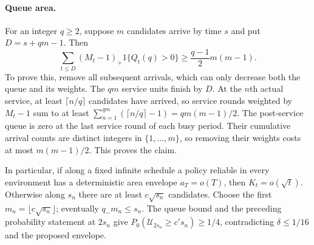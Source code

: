 \paragraph{Queue area.}
For an integer $q\ge2$, suppose $m$ candidates arrive by time $s$ and put
$D=s+qm-1$. Then
\[
 \sum_{t\le D}(M_t-1)_+1\{Q_t(q)>0\}
 \ge\frac{q-1}{2}m(m-1).
\]
To prove this, remove all subsequent arrivals, which can only decrease both
the queue and its weights. The $qm$ service units finish by $D$. At the
$n$th actual service, at least $\lceil n/q\rceil$ candidates have arrived,
so service rounds weighted by $M_t-1$ sum to at least
$\sum_{n=1}^{qm}(\lceil n/q\rceil-1)=qm(m-1)/2$.
The post-service queue is zero at the last service round of each busy period.
Their cumulative arrival counts are distinct integers in $\{1,\ldots,m\}$,
so removing their weights costs at most $m(m-1)/2$. This proves the claim.

In particular, if along a fixed infinite schedule a policy reliable in every
environment has a deterministic area envelope $a_T=o(T)$, then
$K_t=o(\sqrt t)$. Otherwise along $s_n$ there are at least $c\sqrt{s_n}$
candidates. Choose the first $m_n=\lfloor c\sqrt{s_n}\rfloor$; eventually
$q_-m_n\le s_n$. The queue bound and the preceding probability statement at
$2s_n$ give $P_0(\mathcal U_{2s_n}\ge c's_n)\ge1/4$, contradicting
$\delta\le1/16$ and the proposed envelope.
